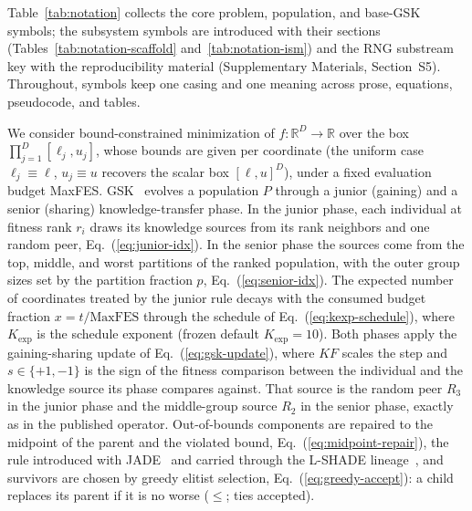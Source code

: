 Table~\ref{tab:notation} collects the core problem, population, and base-GSK
symbols; the subsystem symbols are introduced with their sections
(Tables~\ref{tab:notation-scaffold} and~\ref{tab:notation-ism}) and the RNG
substream key with the reproducibility material (Supplementary Materials, Section~S5). Throughout,
symbols keep one casing and one meaning across prose, equations, pseudocode,
and tables.



We consider bound-constrained minimization of
$f:\mathbb{R}^D\to\mathbb{R}$ over the box
$\prod_{j=1}^{D}[\ell_j,u_j]$, whose bounds are given per coordinate
(the uniform case $\ell_j\equiv\ell$, $u_j\equiv u$ recovers the scalar
box $[\ell,u]^D$), under a fixed
evaluation budget MaxFES.
GSK~\cite{mohamed2020gaining} evolves a population $P$ through a
junior (gaining) and a senior (sharing) knowledge-transfer phase.
In the junior phase, each individual at fitness rank $r_i$ draws its
knowledge sources from its rank neighbors and one random peer,
Eq.~(\ref{eq:junior-idx}). In the senior phase the sources come from
the top, middle, and worst partitions of the ranked population, with
the outer group sizes set by the partition fraction $p$,
Eq.~(\ref{eq:senior-idx}).
The expected number of coordinates treated by the junior rule decays with the
consumed budget fraction $x=t/\text{MaxFES}$ through the schedule of
Eq.~(\ref{eq:kexp-schedule}), where $K_{\exp}$ is the schedule exponent
(frozen default $K_{\exp}=10$). %
Both phases apply the gaining-sharing update of
Eq.~(\ref{eq:gsk-update}), where $KF$ scales the step and
$s\in\{+1,-1\}$ is the sign of the fitness comparison between the
individual and the knowledge source its phase compares against. That source is
the random peer $R_3$ in the junior phase and the middle-group source $R_2$
in the senior phase, exactly as in the published operator.
Out-of-bounds components are repaired to the midpoint of the parent and
the violated bound, Eq.~(\ref{eq:midpoint-repair}), the rule introduced
with JADE~\cite{zhang2009jade} and carried through the L-SHADE
lineage~\cite{tanabe2014improving}, and survivors are chosen by
greedy elitist selection, Eq.~(\ref{eq:greedy-accept}): a
child replaces its parent if it is no worse ($\le$; ties accepted).

